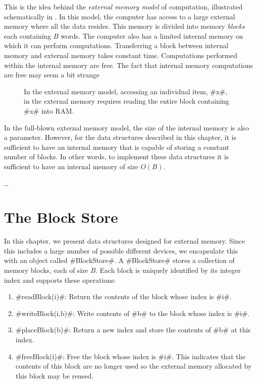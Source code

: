 
This is the idea behind the \emph{external memory model} of computation,
illustrated schematically in .  In this model, the computer
has access to a large external memory where all the data resides.
This memory is divided into memory \emph{blocks} each containing $B$
words.  The computer also has a limited internal memory on which it can
perform computations.  Transferring a block between internal memory and
external memory takes constant time.  Computations performed within the
internal memory are free.  The fact that internal memory computations
are free may seem a bit strange

\begin{figure}
  \caption{In the external memory model, accessing an individual item,
  #x#, in the external memory requires reading the entire block containing
  #x# into RAM.}
\end{figure}

In the full-blown external memory model, the size of the internal memory
is also a parameter.  However, for the data structures described in this
chapter, it is sufficient to have an internal memory that is capable
of storing a constant number of blocks.  In other words, to implement
these data structures it is sufficient to have an internal memory of
size $O(B)$.

\ldots

\section{The Block Store}

In this chapter, we present data structures designed for external memory.
Since this includes a large number of possible different devices, we
encapsulate this with an object called #BlockStore#.  A #BlockStore#
stores a collection of memory blocks, each of size $B$.  Each block is
uniquely identified by its integer index and supports these operations:

\begin{enumerate}
  \item #readBlock(i)#: Return the contents of the block whose index is #i#.

  \item #writeBlock(i,b)#: Write contents of #b# to the block whose
    index is #i#.

  \item #placeBlock(b)#: Return a new index and store the contents of #b#
    at this index.

  \item #freeBlock(i)#: Free the block whose index is #i#.  This indicates
    that the contents of this block are no longer used so the external
    memory allocated by this block may be reused.
\end{enumerate}

